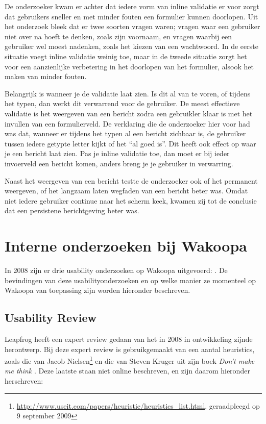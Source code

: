 \documentclass[a4paper, 10pt, pdftex]{report}
\begin{document}
    De onderzoeker kwam er achter dat iedere vorm van inline validatie er voor zorgt dat gebruikers sneller en met minder fouten een formulier kunnen doorlopen. Uit het onderzoek bleek dat er twee soorten vragen waren; vragen waar een gebruiker niet over na hoeft te denken, zoals zijn voornaam, en vragen waarbij een gebruiker wel moest nadenken, zoals het kiezen van een wachtwoord. In de eerste situatie voegt inline validatie weinig toe, maar in de tweede situatie zorgt het voor een aanzienlijke verbetering in het doorlopen van het formulier, alsook het maken van minder fouten.

    Belangrijk is wanneer je de validatie laat zien. Is dit al van te voren, of tijdens het typen, dan werkt dit verwarrend voor de gebruiker. De meest effectieve validatie is het weergeven van een bericht zodra een gebruikler klaar is met het invullen van een formulierveld. De verklaring die de onderzoeker hier voor had was dat, wanneer er tijdens het typen al een bericht zichbaar is, de gebruiker tussen iedere getypte letter kijkt of het ``al goed is''. Dit heeft ook effect op waar je een bericht laat zien. Pas je inline validatie toe, dan moet er bij ieder invoerveld een bericht komen, anders breng je je gebruiker in verwarring.

    Naast het weergeven van een bericht testte de onderzoeker ook of het permanent weergeven, of het langzaam laten wegfaden van een bericht beter was. Omdat niet iedere gebruiker continue naar het scherm keek, kwamen zij tot de conclusie dat een persistene berichtgeving beter was.

  \section{Interne onderzoeken bij Wakoopa}
    In 2008 zijn er drie usability onderzoeken op Wakoopa uitgevoerd: \citet{Timmerman2008, Hoekman2008, Alfrink2008}. De bevindingen van deze usabilityonderzoeken en op welke manier ze momenteel op Wakoopa van toepassing zijn worden hieronder beschreven.

    \subsection{Usability Review \citet{Alfrink2008}}
    Leapfrog heeft een expert review gedaan van het in 2008 in ontwikkeling zijnde herontwerp. Bij deze expert review is gebruikgemaakt van een aantal heuristics, zoals die van Jacob Nielsen\footnote{\url{http://www.useit.com/papers/heuristic/heuristics\_list.html}, geraadpleegd op 9 september 2009} en die van Steven Kruger uit zijn boek \emph{Don't make me think} \citep{Krug2000}. Deze laatste staan niet online beschreven, en zijn daarom hieronder herschreven:
\end{document}
